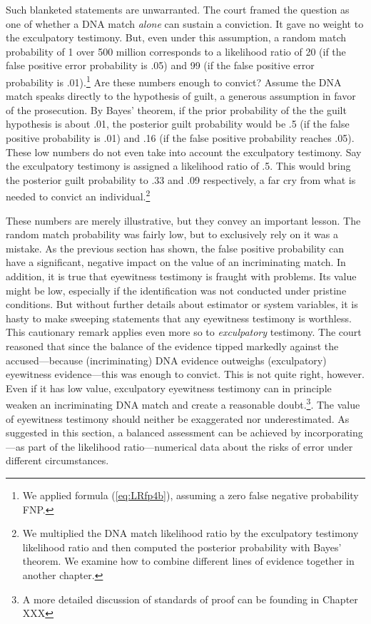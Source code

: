 \documentclass[
  10pt,
  dvipsnames,enabledeprecatedfontcommands]{scrartcl}
\newcommand{\raf}[1]{\todo[color=olive!40]{#1}}
\begin{document}
Such blanketed statements are unwarranted. The court framed the question
as one of whether a DNA match \textit{alone} can sustain a conviction.
It gave no weight to the exculpatory testimony. But, even under this
assumption, a random match probability of 1 over 500 million corresponds
to a likelihood ratio of 20 (if the false positive error probability is
.05) and 99 (if the false positive error probability is .01).\footnote{We
  applied formula (\ref{eq:LRfp4b}), assuming a zero false negative
  probability FNP.} Are these numbers enough to convict? Assume the DNA
match speaks directly to the hypothesis of guilt, a generous assumption
in favor of the prosecution. By Bayes' theorem, if the prior probability
of the the guilt hypothesis is about .01, the posterior guilt
probability would be .5 (if the false positive probability is .01) and
.16 (if the false positive probability reaches .05). These low numbers
do not even take into account the exculpatory testimony. Say the
exculpatory testimony is assigned a likelihood ratio of .5. This would
bring the posterior guilt probability to .33 and .09 respectively, a far
cry from what is needed to convict an individual.\footnote{We multiplied
  the DNA match likelihood ratio by the exculpatory testimony likelihood
  ratio and then computed the posterior probability with Bayes' theorem.
  We examine how to combine different lines of evidence together in
  another chapter.} 
\raf{M: Check calculations}

These numbers are merely illustrative, but they convey an important
lesson. The random match probability was fairly low, but to exclusively
rely on it was a mistake. As the previous section has shown, the false
positive probability can have a significant, negative impact on the
value of an incriminating match. In addition, it is true that eyewitness
testimony is fraught with problems. Its value might be low, especially
if the identification was not conducted under pristine conditions. But
without further details about estimator or system variables, it is hasty
to make sweeping statements that any eyewitness testimony is worthless.
This cautionary remark applies even more so to \textit{exculpatory}
testimony. The court reasoned that since the balance of the evidence
tipped markedly against the accused---because (incriminating) DNA
evidence outweighs (exculpatory) eyewitness evidence---this was enough
to convict. This is not quite right, however. Even if it has low value,
exculpatory eyewitness testimony can in principle weaken an
incriminating DNA match and create a reasonable doubt.\footnote{A more
  detailed discussion of standards of proof can be founding in Chapter
  XXX}. The value of eyewitness testimony should neither be exaggerated
nor underestimated. As suggested in this section, a balanced assessment
can be achieved by incorporating---as part of the likelihood
ratio---numerical data about the risks of error under different
circumstances. 
\end{document}
